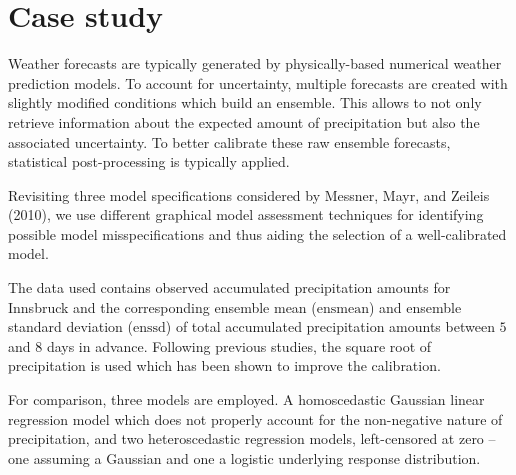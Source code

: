 \documentclass[twoside]{report}
\begin{document}

\maketitle



\section{Case study}

Weather forecasts are typically generated by physically-based numerical weather
prediction models. To account for uncertainty, multiple forecasts are created
with slightly modified conditions which build an ensemble.
This allows to not only retrieve information about the expected amount of precipitation
but also the associated uncertainty. To better calibrate these raw ensemble
forecasts, statistical post-processing is typically applied.

Revisiting three model specifications considered by Messner, Mayr, and Zeileis (2010),
we use different graphical model assessment techniques for identifying possible
model misspecifications and thus aiding the selection of a well-calibrated
model.


The data used contains observed accumulated precipitation amounts for
Innsbruck and the corresponding ensemble mean ($\text{ensmean}$) and
ensemble standard deviation ($\text{enssd}$) of total accumulated precipitation amounts
between $5$ and $8$ days in advance.
Following previous studies, the square root of precipitation is used which has
been shown to improve the calibration.


For comparison, three models are employed. A homoscedastic Gaussian linear regression
model which does not properly account for the non-negative nature of precipitation,
and two heteroscedastic regression models, left-censored at zero --
one assuming a Gaussian and one a logistic underlying response distribution.
\end{document}
